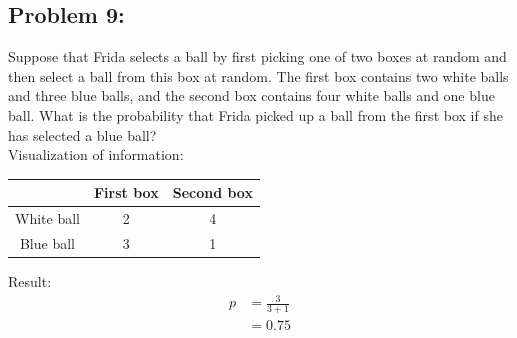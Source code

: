 \documentclass[a4paper]{article}
\begin{document}
\subsection*{Problem 9:}
Suppose that Frida selects a ball by first picking one of two boxes at random and then select a ball from this box at random. The first box contains two white balls and three blue balls, and the second box contains four white balls and one blue ball. What is the probability that Frida picked up a ball from the first box if she has selected a blue ball? \\

Visualization of information:
\begin{center}
	\begin{tabular}{c|c|c}
		           & First box & Second box \\
		\hline
		White ball & 2         & 4          \\
		\hline
		Blue ball  & 3         & 1
	\end{tabular}
\end{center}
Result:
\begin{align*}
	p & = \frac{3}{3 + 1} \\
	  & = 0.75
\end{align*}
\end{document}
